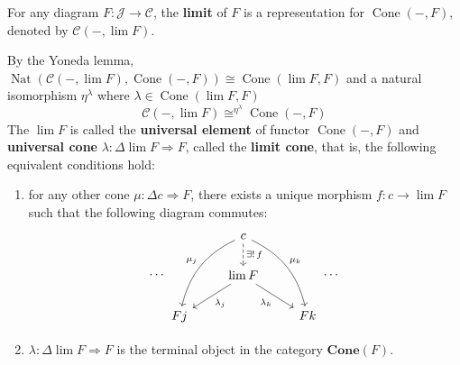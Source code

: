 \documentclass[12pt, oneside]{book}
\begin{document}
\begin{definition}
    For any diagram $F: \mathcal{J} \rightarrow \mathcal{C}$,
    the \textbf{limit} of $F$ is a representation for $\operatorname{Cone}(-, F)$, denoted by $\mathcal{C}\left(-, \lim F\right)$.











    \begin{remark}
        By the Yoneda lemma,
        $\operatorname{Nat}\left(\mathcal{C}\left(-,\lim F\right),\operatorname{Cone}\left(-,F\right)\right)
            \cong
            \operatorname{Cone}\left(\lim F,F\right)$
        and a natural isomorphism $\eta^\lambda $ where $\lambda \in \operatorname{Cone}\left(\lim F,F\right)$
        \begin{equation*}
            \mathcal{C}\left(-,\lim F\right)
            \cong^{\eta^{\lambda}}
            \operatorname{Cone}\left(-,F\right)
        \end{equation*}
        The $\lim F$ is called the \textbf{universal element} of functor $\operatorname{Cone}(-, F)$
        and \textbf{universal cone} $\lambda: \Delta\lim F \Rightarrow F$, called the \textbf{limit cone}, that is, the following equivalent conditions hold:
        \begin{enumerate}
            \item  for any other cone $\mu:\Delta c\Rightarrow F$, there exists a unique morphism $f:c\to \lim F$ such that the following diagram commutes:
                  \begin{equation*}
                      \cdots
                      \begin{tikzcd}
                          &\arrow[ldd,bend right=25,"\mu_j"']c\arrow[d,dashed,"\exists!\, f"]\arrow[rdd,bend left=25,"\mu_k"]&\\
                          &\arrow[ld,"\lambda_j"]  \lim F\arrow[rd,"\lambda_k"'] &\\
                          Fj &&Fk
                      \end{tikzcd}
                      \cdots
                  \end{equation*}
            \item
                  $\lambda: \Delta\lim F \Rightarrow F $ is the terminal object in the category $\mathbf{Cone}\left(F\right)$.
        \end{enumerate}

    \end{remark}
\end{definition}
\end{document}
